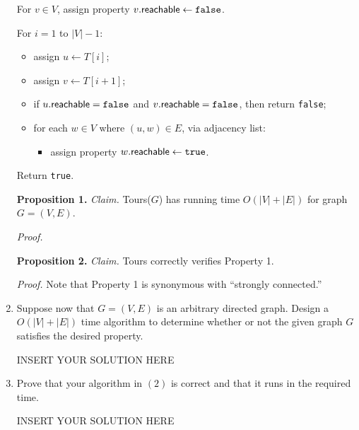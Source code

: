 \begin{enumerate}
\begin{solution}
For $v\in V$, assign property $v.\mathsf{reachable}\leftarrow\verb|false|$.

For $i=1$ to $|V|-1$:
\begin{itemize}
    \item assign $u\leftarrow T[i]$;
    \item assign $v\leftarrow T[i+1]$;
    \item if $u.\mathsf{reachable}=\verb|false|$ and $v.\mathsf{reachable}=\verb|false|$, then return \verb|false|;
    \item for each $w\in V$ where $(u,w)\in E$, via adjacency list:
    \begin{itemize}
    \item assign property $w.\mathsf{reachable}\leftarrow \verb|true|$.
    \end{itemize}
\end{itemize}
Return \verb|true|.

\textbf{Proposition 1. }\textit{Claim. }{\sc Tours}($G$) has running time $O(|V|+|E|)$ for graph $G=(V,E)$.

\textit{Proof. }

\textbf{Proposition 2. }\textit{Claim. }{\sc Tours} correctly verifies Property 1.

\textit{Proof. }Note that Property 1 is synonymous with ``strongly connected.''
\end{solution}

\item Suppose now that $G = (V, E)$ is an arbitrary directed graph. Design a $O(|V|+|E|)$ time algorithm to determine whether or not the given graph $G$ satisfies the desired property. 

\begin{solution}   INSERT YOUR SOLUTION HERE   \end{solution}


\item Prove that your algorithm in $(2)$ is correct and that it runs in the required time.
\begin{solution}   INSERT YOUR SOLUTION HERE   \end{solution}
\end{enumerate}
\newpage
